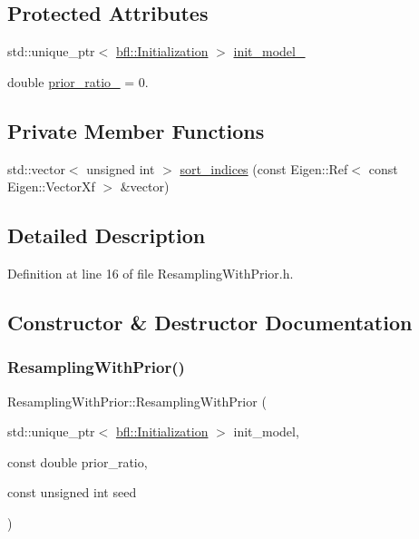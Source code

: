 \subsection*{Protected Attributes}
\begin{DoxyCompactItemize}
\item 
std\+::unique\+\_\+ptr$<$ \mbox{\hyperlink{classbfl_1_1Initialization}{bfl\+::\+Initialization}} $>$ \mbox{\hyperlink{classbfl_1_1ResamplingWithPrior_ae5902ab0af10d76ddb9c12a15db42947}{init\+\_\+model\+\_\+}}
\item 
double \mbox{\hyperlink{classbfl_1_1ResamplingWithPrior_a5f2d0d6f948348428a992232de091c66}{prior\+\_\+ratio\+\_\+}} = 0.
\end{DoxyCompactItemize}
\subsection*{Private Member Functions}
\begin{DoxyCompactItemize}
\item 
std\+::vector$<$ unsigned int $>$ \mbox{\hyperlink{classbfl_1_1ResamplingWithPrior_a9b96b3b950fccbabc6964a0443bc1a1c}{sort\+\_\+indices}} (const Eigen\+::\+Ref$<$ const Eigen\+::\+Vector\+Xf $>$ \&vector)
\end{DoxyCompactItemize}


\subsection{Detailed Description}


Definition at line 16 of file Resampling\+With\+Prior.\+h.



\subsection{Constructor \& Destructor Documentation}
\mbox{\label{classbfl_1_1ResamplingWithPrior_a48293e554e60451e5d455ad1a13dda44}} 
\subsubsection{\texorpdfstring{Resampling\+With\+Prior()}{ResamplingWithPrior()}\hspace{0.1cm}{\footnotesize\ttfamily [1/4]}}
{\footnotesize\ttfamily Resampling\+With\+Prior\+::\+Resampling\+With\+Prior (\begin{DoxyParamCaption}\item[{std\+::unique\+\_\+ptr$<$ \mbox{\hyperlink{classbfl_1_1Initialization}{bfl\+::\+Initialization}} $>$}]{init\+\_\+model,  }\item[{const double}]{prior\+\_\+ratio,  }\item[{const unsigned int}]{seed }\end{DoxyParamCaption})\hspace{0.3cm}{\ttfamily [noexcept]}}



